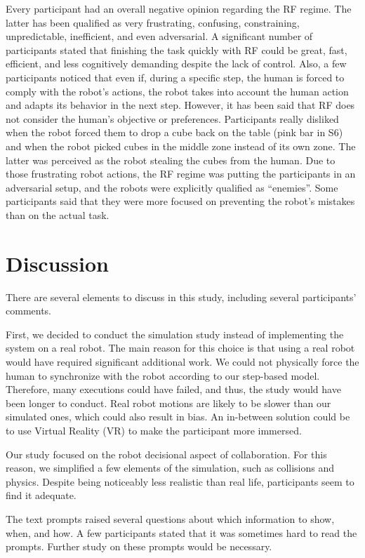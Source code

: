 Every participant had an overall negative opinion regarding the RF regime. The latter has been qualified as very frustrating, confusing, constraining, unpredictable, inefficient, and even adversarial. A significant number of participants stated that finishing the task quickly with RF could be great, fast, efficient, and less cognitively demanding despite the lack of control. Also, a few participants noticed that even if, during a specific step, the human is forced to comply with the robot's actions, the robot takes into account the human action and adapts its behavior in the next step. 
However, it has been said that RF does not consider the human's objective or preferences. Participants really disliked when the robot forced them to drop a cube back on the table (pink bar in S6) and when the robot picked cubes in the middle zone instead of its own zone. The latter was perceived as the robot stealing the cubes from the human.
Due to those frustrating robot actions, the RF regime was putting the participants in an adversarial setup, and the robots were explicitly qualified as ``enemies''. Some participants said that they were more focused on preventing the robot's mistakes than on the actual task.


\section{Discussion}


There are several elements to discuss in this study, including several participants' comments.

First, we decided to conduct the simulation study instead of implementing the system on a real robot. The main reason for this choice is that using a real robot would have required significant additional work. We could not physically force the human to synchronize with the robot according to our step-based model. Therefore, many executions could have failed, and thus, the study would have been longer to conduct. Real robot motions are likely to be slower than our simulated ones, which could also result in bias. An in-between solution could be to use Virtual Reality (VR) to make the participant more immersed.

Our study focused on the robot decisional aspect of collaboration. For this reason, we simplified a few elements of the simulation, such as collisions and physics. Despite being noticeably less realistic than real life, participants seem to find it adequate. 

The text prompts raised several questions about which information to show, when, and how. A few participants stated that it was sometimes hard to read the prompts. Further study on these prompts would be necessary.

